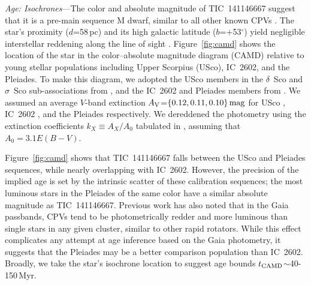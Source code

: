 \documentclass{nature3}
\begin{document}
\begin{methods}
{\it Age: Isochrones}---The color and absolute magnitude of
TIC~141146667 suggest that it is a pre-main sequence M dwarf, similar
to all other known CPVs \cite{Stauffer2017,Stauffer2021,Bouma2024}.
The star's proximity ($d$=58\,pc) and its high galactic latitude
($b$=$+$53$^\circ$) yield negligible interstellar reddening along the
line of sight \cite{Green2019}.  Figure~\ref{fig:camd} shows the
location of the star in the color--absolute magnitude diagram (CAMD)
relative to young stellar populations including Upper Scorpius (USco),
IC~2602, and the Pleiades.  To make this diagram, we adopted the USco
members in the $\delta$~Sco and $\sigma$~Sco sub-associations from
\cite{Ratzenbock2023}, and the IC~2602 and Pleiades members from
\cite{Hunt2024}.  We assumed an average $V$-band extinction $A_{\rm
V}$=$\{0.12, 0.11, 0.10\}\,{\rm mag}$ for USco \cite{Pecaut2016},
IC~2602 \cite{Hunt2024}, and the Pleiades \cite{Hunt2024}
respectively.  We dereddened the photometry using the extinction
coefficients $k_X\equiv A_X/A_0$ tabulated in
\cite{GaiaCollaboration2018}, assuming that $A_0 = 3.1 E(B-V)$.

Figure~\ref{fig:camd} shows that TIC~141146667 falls between
the USco and Pleiades sequences, while nearly overlapping with
IC~2602.  However, the precision of the implied age
is set by the intrinsic scatter of these calibration
sequences; the most luminous stars in the Pleiades of the same color
have a similar absolute magnitude as TIC~141146667.
Previous work \cite{Stauffer2021} has also noted that in the Gaia
passbands, CPVs tend to be photometrically redder and more luminous
than single stars in any given cluster, similar to other rapid
rotators.
While this effect complicates any attempt at age inference based on
the Gaia photometry, it suggests that the Pleiades may be a better
comparison population than IC~2602.  Broadly, we take the star's
isochrone location to suggest age bounds $t_{\rm
CAMD}$$\sim$40-150\,Myr.


\end{methods}
\end{document}
